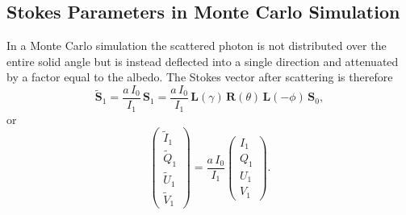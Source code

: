 \documentclass[english,a4paper]{my_memo}
\begin{document}
\subsection{Stokes Parameters in Monte Carlo Simulation}

In a Monte Carlo simulation the scattered photon is not
distributed over the entire solid angle but is instead deflected
into a single direction and attenuated by a factor equal to the
albedo. The Stokes vector after scattering is therefore
\[
\tilde{\mathbf{S}}_{1} = \frac{a\,I_{0}}{I_{1}}\,\mathbf{S}_{1}
   = \frac{a\,I_{0}}{I_{1}}\,\mathbf{L}(\gamma)\,\mathbf{R}(\theta)\,\mathbf{L}(-\phi)\,\mathbf{S}_{0},
\]
or
\[
\left(\begin{array}{c}
\tilde{I}_{1}\\ \tilde{Q}_{1}\\ \tilde{U}_{1}\\ \tilde{V}_{1}
\end{array}\right)
= \frac{a\,I_{0}}{I_{1}}\!\left(\begin{array}{c}
I_{1}\\ Q_{1}\\ U_{1}\\ V_{1}
\end{array}\right).
\]
\end{document}
